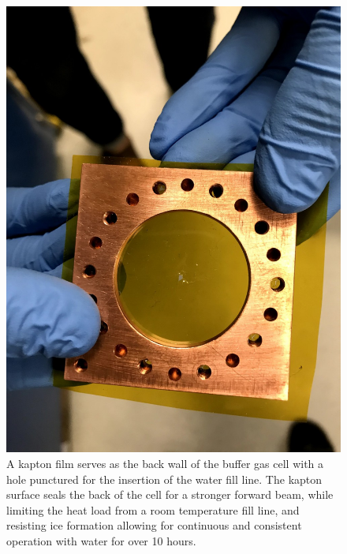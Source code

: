 \begin{figure}[H]
	\centering
	\includegraphics[width=.5\textwidth]{images/CBGB_kapton.jpg}
	\caption{A kapton film serves as the back wall of the buffer gas cell with a hole punctured for the insertion of the water fill line. The kapton surface seals the back of the cell for a stronger forward beam, while limiting the heat load from a room temperature fill line, and resisting ice formation allowing for continuous and consistent operation with water for over 10 hours.}
	\label{fig: kapton film}
\end{figure}